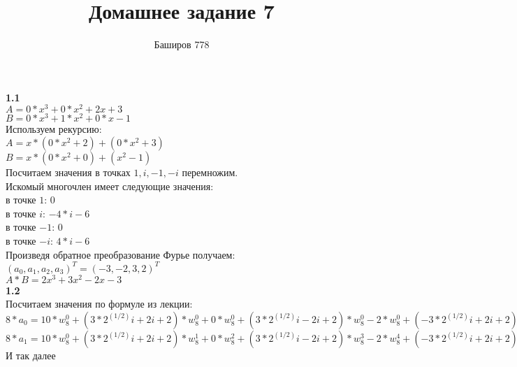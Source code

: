 \documentclass[a4paper,12pt]{article}
\author{Баширов 778}
\title{Домашнее задание 7}
\begin{document}
\maketitle
\newpage
\noindent \large\textbf{1.1}\normalsize\\
$A = 0*x^3 + 0*x^2 + 2x + 3$\\
$B = 0*x^3 + 1*x^2 + 0*x - 1$\\
Используем рекурсию:\\
$A = x*(0*x^2 + 2) + (0*x^2 + 3)$\\
$B = x*(0*x^2 + 0) + (x^2 - 1)$\\
Посчитаем значения в точках $1, i, -1, -i$ перемножим.\\
Искомый многочлен имеет следующие значения:\\
в точке $1$: $0$ \\
в точке $i$: $-4*i - 6$\\
в точке $-1$: $0$\\
в точке $-i$: $4*i - 6$\\

Произведя обратное преобразование Фурье получаем:\\
$(a_0, a_1, a_2, a_3)^T=(-3, -2, 3, 2)^T$\\
$A*B = 2x^3 + 3x^2 - 2x - 3$\\

\large\textbf{1.2}\normalsize\\
Посчитаем значения по формуле из лекции:\\
$8*a_0 = 10*w_8^0 + (3*2^(1/2)i +2i +2)*w_8^0 + 0*w_8^0 + (3*2^(1/2)i -2i +2)*w_8^0 - 2*w_8^0 + (-3*2^(1/2)i +2i +2)*w_8^0 + 0*w_8^0 - (3*2^(1/2)i +2i -2)*w_8^0$\\
$8*a_1 = 10*w_8^0 + (3*2^(1/2)i +2i +2)*w_8^1 + 0*w_8^2 + (3*2^(1/2)i -2i +2)*w_8^3 - 2*w_8^4 + (-3*2^(1/2)i +2i +2)*w_8^5 + 0*w_8^6 - (3*2^(1/2)i +2i -2)*w_8^7$\\
И так далее\\
\end{document}
